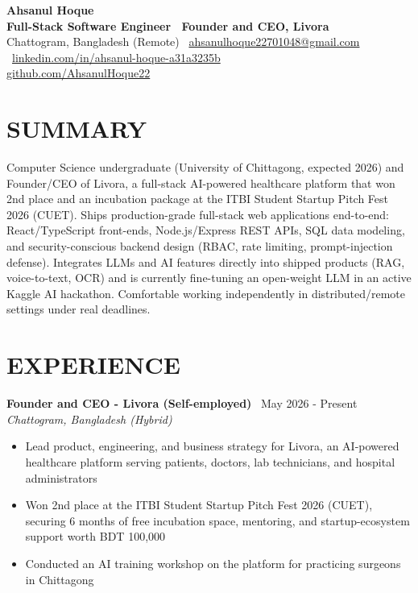 \documentclass[10.5pt,a4paper]{article}
\newenvironment{tightitemize}{
  \begin{itemize}[leftmargin=15pt, itemsep=1pt, parsep=0pt, topsep=2pt]
}{
  \end{itemize}
}
\newcommand{\entry}[3]{%
  \textbf{#1} \textbar\ #2\\
  \textit{#3}%
}
\begin{document}
{\huge \bfseries Ahsanul Hoque}\\[2pt]
{\bfseries Full-Stack Software Engineer \textbar\ Founder and CEO, Livora}\\[5pt]
{\small
  Chattogram, Bangladesh (Remote) \textbar\
  \href{mailto:ahsanulhoque22701048@gmail.com}{ahsanulhoque22701048@gmail.com} \textbar\
  \href{https://linkedin.com/in/ahsanul-hoque-a31a3235b}{linkedin.com/in/ahsanul-hoque-a31a3235b} \textbar\\
  \href{https://github.com/AhsanulHoque22}{github.com/AhsanulHoque22}
}

\section*{SUMMARY}
Computer Science undergraduate (University of Chittagong, expected 2026) and Founder/CEO of Livora, a full-stack AI-powered healthcare platform that won 2nd place and an incubation package at the ITBI Student Startup Pitch Fest 2026 (CUET). Ships production-grade full-stack web applications end-to-end: React/TypeScript front-ends, Node.js/Express REST APIs, SQL data modeling, and security-conscious backend design (RBAC, rate limiting, prompt-injection defense). Integrates LLMs and AI features directly into shipped products (RAG, voice-to-text, OCR) and is currently fine-tuning an open-weight LLM in an active Kaggle AI hackathon. Comfortable working independently in distributed/remote settings under real deadlines.

\section*{EXPERIENCE}

\entry{Founder and CEO - Livora (Self-employed)}{May 2026 - Present}{Chattogram, Bangladesh (Hybrid)}
\begin{tightitemize}
  \item Lead product, engineering, and business strategy for Livora, an AI-powered healthcare platform serving patients, doctors, lab technicians, and hospital administrators
  \item Won 2nd place at the ITBI Student Startup Pitch Fest 2026 (CUET), securing 6 months of free incubation space, mentoring, and startup-ecosystem support worth BDT 100,000
  \item Conducted an AI training workshop on the platform for practicing surgeons in Chittagong
\end{tightitemize}
\end{document}
